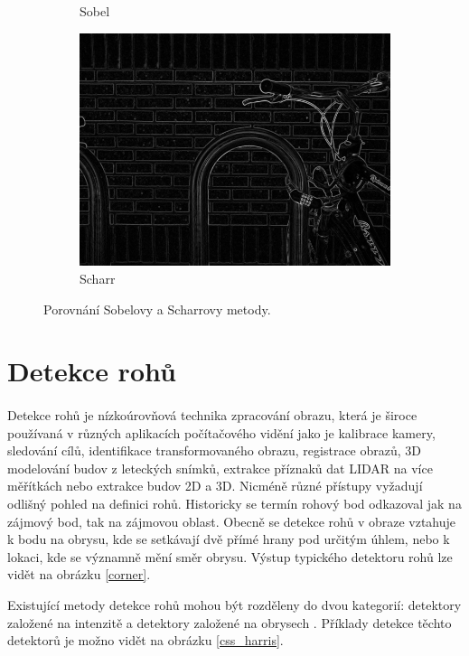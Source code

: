 \begin{figure}[h]
\begin{subfigure}{0.3\textwidth}
    \caption{Sobel}
    \end{subfigure}
    \begin{subfigure}{0.3\textwidth}
    \includegraphics[width=0.9\linewidth]{obrazky-figures/edge_scharr.png}\hfill
    \caption{Scharr}
    \end{subfigure}
    \caption{Porovnání Sobelovy a Scharrovy metody\protect\footnotemark{}.}
    \label{sobel_scharr}
\end{figure}
\section{Detekce rohů}
\label{detekce_rohu}
\paragraph{} Detekce rohů je nízkoúrovňová technika zpracování obrazu, která je široce používaná v různých aplikacích počítačového vidění jako je kalibrace kamery, sledování cílů, identifikace transformovaného obrazu, registrace obrazů, 3D modelování budov z leteckých snímků, extrakce příznaků dat LIDAR na více měřítkách nebo extrakce budov 2D a 3D. Nicméně různé přístupy vyžadují odlišný pohled na definici rohů. Historicky se termín rohový bod odkazoval jak na zájmový bod, tak na zájmovou oblast. Obecně se detekce rohů v obraze vztahuje k bodu na obrysu, kde se setkávají dvě přímé hrany pod určitým úhlem, nebo k lokaci, kde se významně mění směr obrysu. Výstup typického detektoru rohů lze vidět na obrázku \ref{corner}.

Existující metody detekce rohů mohou být rozděleny do dvou kategorií: detektory založené na intenzitě a detektory založené na obrysech \cite{s140304126}. Příklady detekce těchto detektorů je možno vidět na obrázku \ref{css_harris}.

